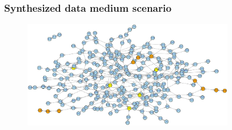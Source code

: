 \documentclass{beamer}
\begin{document}
\begin{frame}[plain]
  \frametitle{Synthesized data medium scenario}
  \begin{figure}
    \includegraphics[width=0.8\textwidth]{synthesized-medium}
  \end{figure}
\end{frame}
\end{document}
